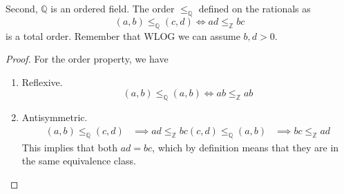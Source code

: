   \begin{theorem}
    Second, $\mathbb{Q}$ is an ordered field. The order $\leq_{\mathbb{Q}}$ defined on the rationals as 
    \begin{equation}
      (a, b) \leq_{\mathbb{Q}} (c, d) \iff ad \leq_{\mathbb{Z}} bc
    \end{equation}
    is a total order. Remember that WLOG we can assume $b, d > 0$.  
  \end{theorem}
  \begin{proof}
    For the order property, we have 
    \begin{enumerate}
      \item Reflexive. 
      \begin{equation}
        (a, b) \leq_{\mathbb{Q}} (a, b) \iff ab \leq_{\mathbb{Z}} ab
      \end{equation} 

      \item Antisymmetric. 
      \begin{align}
        (a, b) \leq_{\mathbb{Q}} (c, d) & \implies ad \leq_{\mathbb{Z}} bc
        (c, d) \leq_{\mathbb{Q}} (a, b) & \implies bc \leq_{\mathbb{Z}} ad
      \end{align} 
      This implies that both $ad = bc$, which by definition means that they are in the same equivalence class. 


\end{enumerate}
\end{proof}

